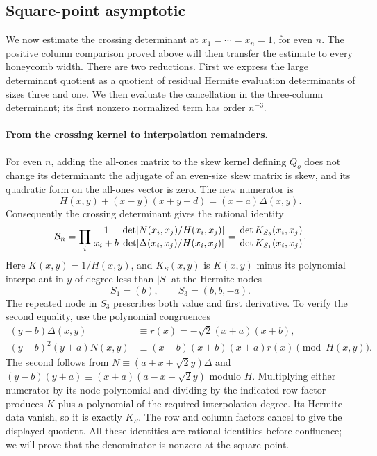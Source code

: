 \documentclass[11pt]{article}
\numberwithin{equation}{section}
\theoremstyle{definition}\newtheorem{definition}[theorem]{Definition}
\theoremstyle{remark}\newtheorem{remark}[theorem]{Remark}
\begin{document}
\subsection{Square-point asymptotic}\label{L:step9}

We now estimate the crossing determinant at $x_1=\cdots=x_n=1$,
for even $n$. The positive column comparison proved above will then
transfer the estimate to every honeycomb width. There are two reductions.
First we express the large determinant quotient as a quotient of residual
Hermite evaluation determinants of sizes three and one. We then evaluate
the cancellation in the three-column determinant; its first nonzero
normalized term has order $n^{-3}$.

\paragraph{From the crossing kernel to interpolation remainders.}
For even $n$, adding the all-ones matrix to the skew kernel defining
$Q_o$ does not change its determinant: the adjugate of an even-size skew
matrix is skew, and its quadratic form on the all-ones vector is zero.
The new numerator is
\[
 H(x,y)+(x-y)(x+y+d)=(x-a)\Delta(x,y).
\]
Consequently the crossing determinant gives the rational identity
\[
 {\cal B}_n
 =\prod_i\frac1{x_i+b}\,
   \frac{\det[N(x_i,x_j)/H(x_i,x_j)]}
        {\det[\Delta(x_i,x_j)/H(x_i,x_j)]}
 =\frac{\det K_{S_3}(x_i,x_j)}{\det K_{S_1}(x_i,x_j)}.
\]
Here $K(x,y)=1/H(x,y)$, and $K_S(x,y)$ is $K(x,y)$ minus its
polynomial interpolant in $y$ of degree less than $|S|$ at the Hermite
nodes
\[
 S_1=(b),\qquad S_3=(b,b,-a).
\]
The repeated node in $S_3$ prescribes both value and first derivative.
To verify the second equality, use the polynomial congruences
\[
\begin{split}
 (y-b)\Delta(x,y)&\equiv r(x)=-\sqrt2(x+a)(x+b),\\
 (y-b)^2(y+a)N(x,y)&\equiv(x-b)(x+b)(x+a)r(x)
 \pmod{H(x,y)}.
\end{split}
\]
The second follows from $N\equiv(a+x+\sqrt2y)\Delta$ and
$(y-b)(y+a)\equiv(x+a)(a-x-\sqrt2y)$ modulo $H$.
Multiplying either numerator by its node polynomial and dividing by the
indicated row factor produces $K$ plus a polynomial of the required
interpolation degree. Its Hermite data vanish, so it is exactly $K_S$.
The row and column factors cancel to give the displayed quotient.
All these identities are rational identities before confluence; we will
prove that the denominator is nonzero at the square point.
\end{document}
